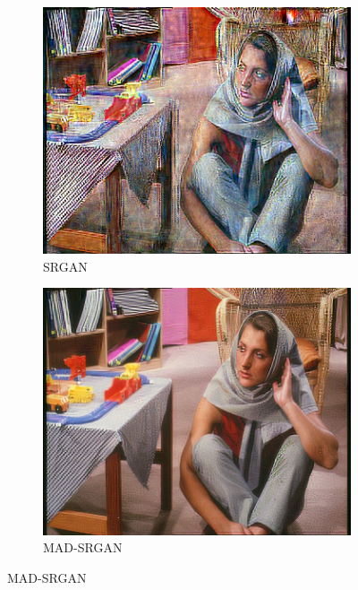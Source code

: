 \documentclass[12pt,a4paper]{article}
\begin{document}
\begin{figure}[H]
            \enspace
            \begin{subfigure}{0.2\textwidth}
                \includegraphics[width=\textwidth]{images/samples/img-2-srgan.png}
                \caption*{SRGAN}
            \end{subfigure}
            \enspace
            \begin{subfigure}{0.2\textwidth}
                \includegraphics[width=\textwidth]{images/samples/img-2-mad-srgan.png}
                \caption*{MAD-SRGAN}
            \end{subfigure}
        \end{figure}
\end{document}
